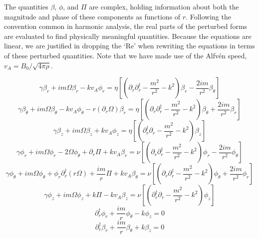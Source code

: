 \documentclass[letterpaper]{article}
\begin{document}
The quantities $\beta$, $\phi$, and $\Pi$ are complex, holding
information about both the magnitude and phase of these components as
functions of $r$. Following the convention common in harmonic
analysis, the real parts of the perturbed forms are evaluated to find
physically meaningful quantities. Because the equations are linear, we
are justified in dropping the `$\mathrm{Re}$' when rewriting the
equations in terms of these perturbed quantities. Note that we have
made use of the Alfv\'{e}n speed, $v_A = B_0/\sqrt{4\pi\rho}$.

\begin{equation}\label{eqn:globalcode:rind_p}
\gamma \beta_r + im\Omega\beta_r - kv_A\phi_r
 = \eta\left[\left(\partial_r \partial_r^\dagger
 - \frac{m^2}{r^2} - k^2\right)\beta_r - \frac{2im}{r^2}\beta_\theta\right]
\end{equation}
\begin{equation}\label{eqn:globalcode:tind_p}
\gamma \beta_\theta + im\Omega\beta_\theta - kv_A \phi_\theta
 - r(\partial_r \Omega)\beta_r
 = \eta\left[\left(\partial_r \partial_r^\dagger
 - \frac{m^2}{r^2} - k^2\right)\beta_\theta + \frac{2im}{r^2}\beta_r\right]
\end{equation}
\begin{equation}\label{eqn:globalcode:zind_p}
\gamma \beta_z + im\Omega\beta_z + kv_A \phi_z
 = \eta\left[\left(\partial_r^\dagger \partial_r
 -\frac{m^2}{r^2} - k^2\right)\beta_z\right]
\end{equation}
\begin{equation}\label{eqn:globalcode:reul_p}
\gamma \phi_r + im\Omega\phi_r - 2\Omega\phi_\theta + \partial_r \Pi
 + kv_A\beta_r = \nu\left[\left(\partial_r \partial_r^\dagger
 - \frac{m^2}{r^2} - k^2\right)\phi_r - \frac{2im}{r^2}\phi_\theta\right]
\end{equation}
\begin{equation}\label{eqn:globalcode:teul_p}
\gamma \phi_\theta + im\Omega\phi_\theta + \phi_r \partial_r^\dagger(r\Omega)
 + \frac{im}{r}\Pi + kv_A \beta_\theta
 = \nu\left[\left(\partial_r \partial_r^\dagger - \frac{m^2}{r^2} 
 - k^2\right)\phi_\theta + \frac{2im}{r^2}\phi_r\right]
\end{equation}
\begin{equation}\label{eqn:globalcode:zeul_p}
\gamma \phi_z + im\Omega{\phi_z} + k\Pi - kv_A \beta_z
 = \nu\left[\left(\partial_r^\dagger \partial_r 
 - \frac{m^2}{r^2} - k^2\right)\phi_z\right]
\end{equation}
\begin{equation}\label{eqn:globalcode:inc_p}
\partial_r^\dagger \phi_r + \frac{im}{r}\phi_\theta - k\phi_z = 0
\end{equation}
\begin{equation}\label{eqn:globalcode:delB_p}
\partial_r^\dagger \beta_r + \frac{im}{r}\beta_\theta + k\beta_z = 0
\end{equation}
\end{document}

